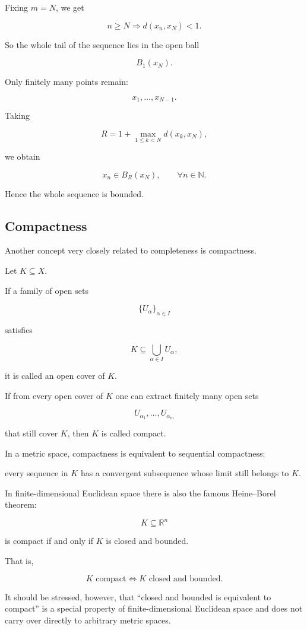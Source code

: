 \documentclass[11pt]{article}
\begin{document}
Fixing $m=N$, we get

\[
n\geq N\Longrightarrow d(x_{n},x_{N})<1.
\]

So the whole tail of the sequence lies in the open ball

\[
B_{1}(x_{N}).
\]

Only finitely many points remain:

\[
x_{1},\ldots,x_{N-1}.
\]

Taking

\[
R=1+\max_{1\leq k<N}d(x_{k},x_{N}),
\]

we obtain

\[
x_{n}\in B_{R}(x_{N}),\qquad\forall n\in\mathbb{N}.
\]

Hence the whole sequence is bounded.

\subsection{Compactness}

Another concept very closely related to completeness is compactness.

Let $K\subseteq X$.

If a family of open sets

\[
\{U_{\alpha}\}_{\alpha\in I}
\]

satisfies

\[
K\subseteq\bigcup_{\alpha\in I}U_{\alpha},
\]

it is called an open cover of $K$.

If from every open cover of $K$ one can extract finitely many open sets

\[
U_{\alpha_{1}},\ldots,U_{\alpha_{m}}
\]

that still cover $K$, then $K$ is called compact.

In a metric space, compactness is equivalent to sequential compactness:

every sequence in $K$ has a convergent subsequence whose limit still belongs to $K$.

In finite-dimensional Euclidean space there is also the famous Heine--Borel theorem:

\[
K\subseteq\mathbb{R}^{n}
\]

is compact if and only if $K$ is closed and bounded.

That is,

\[
K\text{ compact}\Longleftrightarrow K\text{ closed and bounded}.
\]

It should be stressed, however, that ``closed and bounded is equivalent to compact'' is a special property of finite-dimensional Euclidean space and does not carry over directly to arbitrary metric spaces.
\end{document}
